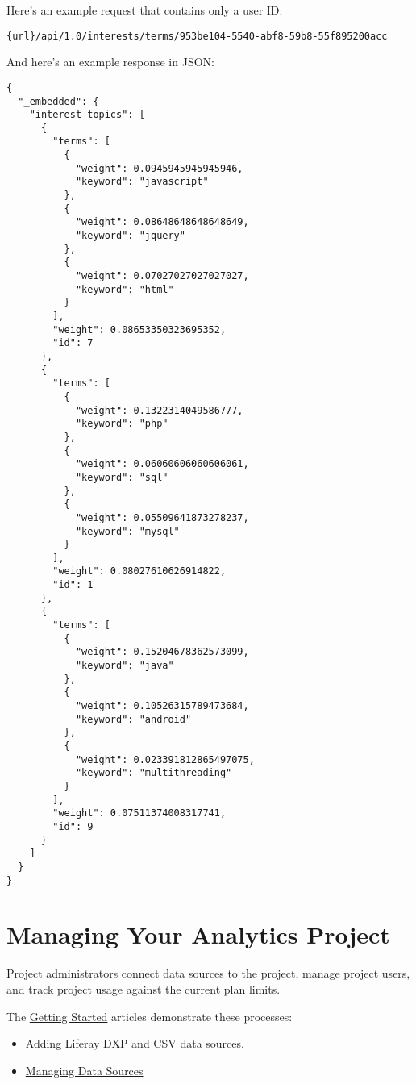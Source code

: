 Here's an example request that contains only a user ID:

\begin{verbatim}
{url}/api/1.0/interests/terms/953be104-5540-abf8-59b8-55f895200acc
\end{verbatim}

And here's an example response in JSON:

\begin{verbatim}
{
  "_embedded": {
    "interest-topics": [
      {
        "terms": [
          {
            "weight": 0.0945945945945946,
            "keyword": "javascript"
          },
          {
            "weight": 0.08648648648648649,
            "keyword": "jquery"
          },
          {
            "weight": 0.07027027027027027,
            "keyword": "html"
          }
        ],
        "weight": 0.08653350323695352,
        "id": 7
      },
      {
        "terms": [
          {
            "weight": 0.1322314049586777,
            "keyword": "php"
          },
          {
            "weight": 0.06060606060606061,
            "keyword": "sql"
          },
          {
            "weight": 0.05509641873278237,
            "keyword": "mysql"
          }
        ],
        "weight": 0.08027610626914822,
        "id": 1
      },
      {
        "terms": [
          {
            "weight": 0.15204678362573099,
            "keyword": "java"
          },
          {
            "weight": 0.10526315789473684,
            "keyword": "android"
          },
          {
            "weight": 0.023391812865497075,
            "keyword": "multithreading"
          }
        ],
        "weight": 0.07511374008317741,
        "id": 9
      }
    ]
  }
}
\end{verbatim}

\chapter{Managing Your Analytics
Project}\label{managing-your-analytics-project}

Project administrators connect data sources to the project, manage
project users, and track project usage against the current plan limits.

The
\href{https://github.com/liferay/liferay-docs/blob/7.1.x/discover/analytics-cloud/articles/02-getting-started/00-getting-started-intro.markdown}{Getting
Started} articles demonstrate these processes:

\begin{itemize}
\item
  Adding
  \href{https://github.com/liferay/liferay-docs/blob/7.1.x/discover/analytics-cloud/articles/02-getting-started/02-adding-a-liferay-dxp-data-source.markdown}{Liferay
  DXP} and
  \href{https://github.com/liferay/liferay-docs/blob/7.1.x/discover/analytics-cloud/articles/02-getting-started/03-adding-a-csv-data-source.markdown}{CSV}
  data sources.
\item
  \href{https://github.com/liferay/liferay-docs/blob/7.1.x/discover/analytics-cloud/articles/02-getting-started/01-managing-data-sources.markdown}{Managing
  Data Sources}
\end{itemize}

